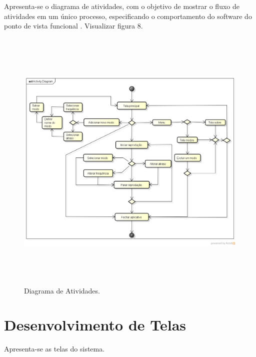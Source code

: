 Apresenta-se o diagrama de atividades, com o objetivo de mostrar o fluxo de atividades em um \'unico processo, especificando o comportamento do software do ponto de vista funcional \cite{Ventura2016a}. Visualizar figura 8. 
\begin{figure}[H]
	\centering
	\caption[Diagrama de Atividades]{Diagrama de Atividades. \label{fig:diagramadeatividades}}
	\includegraphics[height=13cm]{./Figuras/activity_diagram.png}%
\end{figure}

\section{Desenvolvimento de Telas}

Apresenta-se as telas do sistema. 

